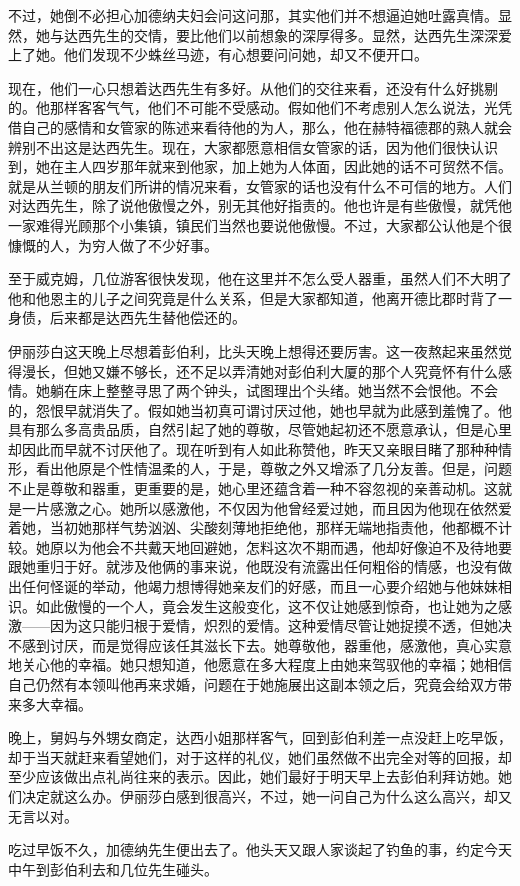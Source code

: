 \par 不过，她倒不必担心加德纳夫妇会问这问那，其实他们并不想逼迫她吐露真情。显然，她与达西先生的交情，要比他们以前想象的深厚得多。显然，达西先生深深爱上了她。他们发现不少蛛丝马迹，有心想要问问她，却又不便开口。
\par 现在，他们一心只想着达西先生有多好。从他们的交往来看，还没有什么好挑剔的。他那样客客气气，他们不可能不受感动。假如他们不考虑别人怎么说法，光凭借自己的感情和女管家的陈述来看待他的为人，那么，他在赫特福德郡的熟人就会辨别不出这是达西先生。现在，大家都愿意相信女管家的话，因为他们很快认识到，她在主人四岁那年就来到他家，加上她为人体面，因此她的话不可贸然不信。就是从兰顿的朋友们所讲的情况来看，女管家的话也没有什么不可信的地方。人们对达西先生，除了说他傲慢之外，别无其他好指责的。他也许是有些傲慢，就凭他一家难得光顾那个小集镇，镇民们当然也要说他傲慢。不过，大家都公认他是个很慷慨的人，为穷人做了不少好事。
\par 至于威克姆，几位游客很快发现，他在这里并不怎么受人器重，虽然人们不大明了他和他恩主的儿子之间究竟是什么关系，但是大家都知道，他离开德比郡时背了一身债，后来都是达西先生替他偿还的。
\par 伊丽莎白这天晚上尽想着彭伯利，比头天晚上想得还要厉害。这一夜熬起来虽然觉得漫长，但她又嫌不够长，还不足以弄清她对彭伯利大厦的那个人究竟怀有什么感情。她躺在床上整整寻思了两个钟头，试图理出个头绪。她当然不会恨他。不会的，怨恨早就消失了。假如她当初真可谓讨厌过他，她也早就为此感到羞愧了。他具有那么多高贵品质，自然引起了她的尊敬，尽管她起初还不愿意承认，但是心里却因此而早就不讨厌他了。现在听到有人如此称赞他，昨天又亲眼目睹了那种种情形，看出他原是个性情温柔的人，于是，尊敬之外又增添了几分友善。但是，问题不止是尊敬和器重，更重要的是，她心里还蕴含着一种不容忽视的亲善动机。这就是一片感激之心。她所以感激他，不仅因为他曾经爱过她，而且因为他现在依然爱着她，当初她那样气势汹汹、尖酸刻薄地拒绝他，那样无端地指责他，他都概不计较。她原以为他会不共戴天地回避她，怎料这次不期而遇，他却好像迫不及待地要跟她重归于好。就涉及他俩的事来说，他既没有流露出任何粗俗的情感，也没有做出任何怪诞的举动，他竭力想博得她亲友们的好感，而且一心要介绍她与他妹妹相识。如此傲慢的一个人，竟会发生这般变化，这不仅让她感到惊奇，也让她为之感激——因为这只能归根于爱情，炽烈的爱情。这种爱情尽管让她捉摸不透，但她决不感到讨厌，而是觉得应该任其滋长下去。她尊敬他，器重他，感激他，真心实意地关心他的幸福。她只想知道，他愿意在多大程度上由她来驾驭他的幸福；她相信自己仍然有本领叫他再来求婚，问题在于她施展出这副本领之后，究竟会给双方带来多大幸福。
\par 晚上，舅妈与外甥女商定，达西小姐那样客气，回到彭伯利差一点没赶上吃早饭，却于当天就赶来看望她们，对于这样的礼仪，她们虽然做不出完全对等的回报，却至少应该做出点礼尚往来的表示。因此，她们最好于明天早上去彭伯利拜访她。她们决定就这么办。伊丽莎白感到很高兴，不过，她一问自己为什么这么高兴，却又无言以对。
\par 吃过早饭不久，加德纳先生便出去了。他头天又跟人家谈起了钓鱼的事，约定今天中午到彭伯利去和几位先生碰头。



